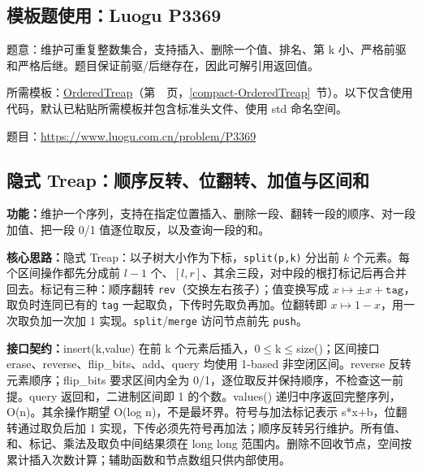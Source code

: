 

\Needspace{447pt}

\subsection*{模板题使用：Luogu P3369}

\label{usage-example-8}

题意：维护可重复整数集合，支持插入、删除一个值、排名、第 k 小、严格前驱和严格后继。题目保证前驱/后继存在，因此可解引用返回值。

所需模板：\hyperref[compact-OrderedTreap]{OrderedTreap}（第~\pageref{compact-OrderedTreap}~页，\ref{compact-OrderedTreap}~节）。以下仅含使用代码，默认已粘贴所需模板并包含标准头文件、使用 std 命名空间。

题目：\url{https://www.luogu.com.cn/problem/P3369}



\newpage

\subsection{隐式 Treap：顺序反转、位翻转、加值与区间和}\label{compact-SequenceTreap}

\noindent\textbf{功能：}\allowbreak 维护一个序列，支持在指定位置插入、删除一段、翻转一段的顺序、对一段加值、把一段 0/1 值逐位取反，以及查询一段的和。

\textbf{核心思路：}\allowbreak 隐式 Treap：以子树大小作为下标，\texttt{split(p,k)} 分出前 $k$ 个元素。每个区间操作都先分成前 $l-1$ 个、$[l,r]$、其余三段，对中段的根打标记后再合并回去。标记有三种：顺序翻转 \texttt{rev}（交换左右孩子）；值变换写成 $x\mapsto \pm x+\texttt{tag}$，取负时连同已有的 \texttt{tag} 一起取负，下传时先取负再加。位翻转即 $x\mapsto 1-x$，用一次取负加一次加 1 实现。\texttt{split}/\texttt{merge} 访问节点前先 \texttt{push}。



{\sloppy{}\noindent\textbf{接口契约：}insert(k,value) 在前 k 个元素后插入，0$\le$k$\le$size()；区间接口 erase、reverse、flip\_bits、add、query 均使用 1-based 非空闭区间。reverse 反转元素顺序；flip\_bits 要求区间内全为 0/1，逐位取反并保持顺序，不检查这一前提。query 返回和，二进制区间即 1 的个数。values() 递归中序返回完整序列，O(n)。其余操作期望 O(log n)，不是最坏界。符号与加法标记表示 s*x+b，位翻转通过取负后加 1 实现，下传必须先符号再加法；顺序反转另行维护。所有值、和、标记、乘法及取负中间结果须在 long long 范围内。删除不回收节点，空间按累计插入次数计算；辅助函数和节点数组只供内部使用。\par}

